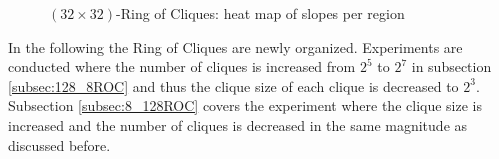 \begin{figure}
    \centering
    \caption{$(32\times32)$-Ring of Cliques: heat map of slopes per region}
    \label{fig:ringOfCliquesslopes}
\end{figure}

In the following the Ring of Cliques are newly organized. Experiments are conducted where the number of cliques is increased from $2^{5}$ to $2^{7}$ in subsection \ref{subsec:128_8ROC} and thus the clique size of each clique is decreased to $2^{3}$. Subsection \ref{subsec:8_128ROC} covers the experiment where the clique size is increased and the number of cliques is decreased in the same magnitude as discussed before.

